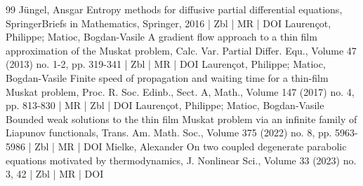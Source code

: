 \begin{thebibliography}{99}
Jüngel, Ansgar Entropy methods for diffusive partial differential equations, SpringerBriefs in Mathematics, Springer, 2016 | Zbl | MR | DOI
Laurençot, Philippe; Matioc, Bogdan-Vasile A gradient flow approach to a thin film approximation of the Muskat problem, Calc. Var. Partial Differ. Equ., Volume 47 (2013) no. 1-2, pp. 319-341 | Zbl | MR | DOI
Laurençot, Philippe; Matioc, Bogdan-Vasile Finite speed of propagation and waiting time for a thin-film Muskat problem, Proc. R. Soc. Edinb., Sect. A, Math., Volume 147 (2017) no. 4, pp. 813-830 | MR | Zbl | DOI
Laurençot, Philippe; Matioc, Bogdan-Vasile Bounded weak solutions to the thin film Muskat problem via an infinite family of Liapunov functionals, Trans. Am. Math. Soc., Volume 375 (2022) no. 8, pp. 5963-5986 | Zbl | MR | DOI
Mielke, Alexander On two coupled degenerate parabolic equations motivated by thermodynamics, J. Nonlinear Sci., Volume 33 (2023) no. 3, 42 | Zbl | MR | DOI
\end{thebibliography}
